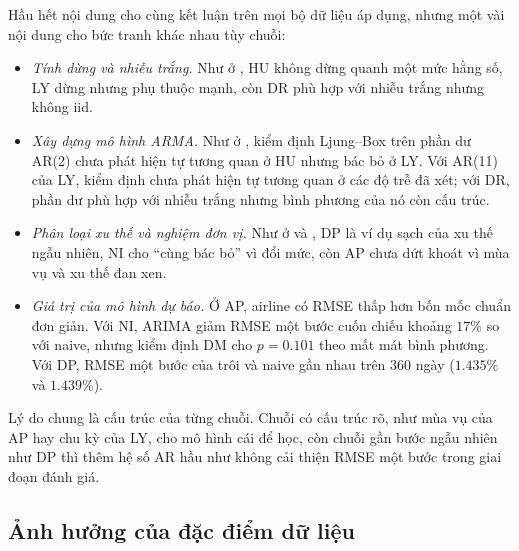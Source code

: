 Hầu hết nội dung cho cùng kết luận trên mọi bộ dữ liệu áp dụng, nhưng một vài nội dung cho bức tranh khác nhau tùy chuỗi:
\begin{itemize}[leftmargin=*,itemsep=2pt]
\item \emph{Tính dừng và nhiễu trắng.} Như ở , HU không dừng quanh một mức hằng số, LY dừng nhưng phụ thuộc mạnh, còn DR phù hợp với nhiễu trắng nhưng không iid.
\item \emph{Xây dựng mô hình ARMA.} Như ở , kiểm định Ljung--Box trên phần dư AR(2) chưa phát hiện tự tương quan ở HU nhưng bác bỏ ở LY. Với AR(11) của LY, kiểm định chưa phát hiện tự tương quan ở các độ trễ đã xét; với DR, phần dư phù hợp với nhiễu trắng nhưng bình phương của nó còn cấu trúc.
\item \emph{Phân loại xu thế và nghiệm đơn vị.} Như ở  và , DP là ví dụ sạch của xu thế ngẫu nhiên, NI cho ``cùng bác bỏ'' vì đổi mức, còn AP chưa dứt khoát vì mùa vụ và xu thế đan xen.
\item \emph{Giá trị của mô hình dự báo.} Ở AP, airline có RMSE thấp hơn bốn mốc chuẩn đơn giản. Với NI, ARIMA giảm RMSE một bước cuốn chiếu khoảng $17\%$ so với naive, nhưng kiểm định DM cho $p=0.101$ theo mất mát bình phương. Với DP, RMSE một bước của trôi và naive gần nhau trên $360$ ngày ($1.435\%$ và $1.439\%$).
\end{itemize}
Lý do chung là cấu trúc của từng chuỗi. Chuỗi có cấu trúc rõ, như mùa vụ của AP hay chu kỳ của LY, cho mô hình cái để học, còn chuỗi gần bước ngẫu nhiên như DP thì thêm hệ số AR hầu như không cải thiện RMSE một bước trong giai đoạn đánh giá.

\subsection{Ảnh hưởng của đặc điểm dữ liệu}

